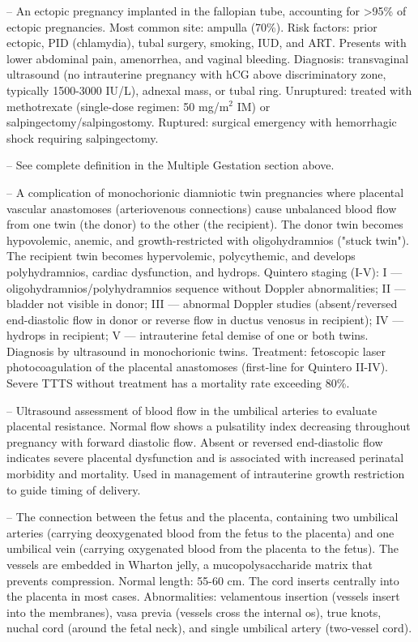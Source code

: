 -- An ectopic pregnancy implanted in the fallopian tube, accounting for >95\% of ectopic pregnancies. Most common site: ampulla (70\%). Risk factors: prior ectopic, PID (chlamydia), tubal surgery, smoking, IUD, and ART. Presents with lower abdominal pain, amenorrhea, and vaginal bleeding. Diagnosis: transvaginal ultrasound (no intrauterine pregnancy with hCG above discriminatory zone, typically 1500-3000 IU/L), adnexal mass, or tubal ring. Unruptured: treated with methotrexate (single-dose regimen: 50 mg/m$^2$ IM) or salpingectomy/salpingostomy. Ruptured: surgical emergency with hemorrhagic shock requiring salpingectomy.

-- See complete definition in the Multiple Gestation section above.

-- A complication of monochorionic diamniotic twin pregnancies where placental vascular anastomoses (arteriovenous connections) cause unbalanced blood flow from one twin (the donor) to the other (the recipient). The donor twin becomes hypovolemic, anemic, and growth-restricted with oligohydramnios ("stuck twin"). The recipient twin becomes hypervolemic, polycythemic, and develops polyhydramnios, cardiac dysfunction, and hydrops. Quintero staging (I-V): I — oligohydramnios/polyhydramnios sequence without Doppler abnormalities; II — bladder not visible in donor; III — abnormal Doppler studies (absent/reversed end-diastolic flow in donor or reverse flow in ductus venosus in recipient); IV — hydrops in recipient; V — intrauterine fetal demise of one or both twins. Diagnosis by ultrasound in monochorionic twins. Treatment: fetoscopic laser photocoagulation of the placental anastomoses (first-line for Quintero II-IV). Severe TTTS without treatment has a mortality rate exceeding 80\%.

-- Ultrasound assessment of blood flow in the umbilical arteries to evaluate placental resistance. Normal flow shows a pulsatility index decreasing throughout pregnancy with forward diastolic flow. Absent or reversed end-diastolic flow indicates severe placental dysfunction and is associated with increased perinatal morbidity and mortality. Used in management of intrauterine growth restriction to guide timing of delivery.

-- The connection between the fetus and the placenta, containing two umbilical arteries (carrying deoxygenated blood from the fetus to the placenta) and one umbilical vein (carrying oxygenated blood from the placenta to the fetus). The vessels are embedded in Wharton jelly, a mucopolysaccharide matrix that prevents compression. Normal length: 55-60 cm. The cord inserts centrally into the placenta in most cases. Abnormalities: velamentous insertion (vessels insert into the membranes), vasa previa (vessels cross the internal os), true knots, nuchal cord (around the fetal neck), and single umbilical artery (two-vessel cord).

